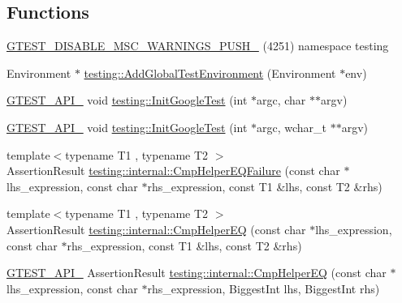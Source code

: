 \subsection*{Functions}
\begin{DoxyCompactItemize}
\item 
\mbox{\hyperlink{_obj__test_2lib_2googletest-release-1_88_81_2googletest_2include_2gtest_2gtest_8h_a88f79832f9d045112a76e9da8611cc13}{G\+T\+E\+S\+T\+\_\+\+D\+I\+S\+A\+B\+L\+E\+\_\+\+M\+S\+C\+\_\+\+W\+A\+R\+N\+I\+N\+G\+S\+\_\+\+P\+U\+S\+H\+\_\+}} (4251) namespace testing
\item 
Environment $\ast$ \mbox{\hyperlink{namespacetesting_a224caeebdb6586b728d204367fea1087}{testing\+::\+Add\+Global\+Test\+Environment}} (Environment $\ast$env)
\item 
\mbox{\hyperlink{_obj__test_2lib_2googletest-release-1_88_81_2googletest_2include_2gtest_2internal_2gtest-port_8h_aa73be6f0ba4a7456180a94904ce17790}{G\+T\+E\+S\+T\+\_\+\+A\+P\+I\+\_\+}} void \mbox{\hyperlink{namespacetesting_afd726ae08c9bd16dc52f78c822d9946b}{testing\+::\+Init\+Google\+Test}} (int $\ast$argc, char $\ast$$\ast$argv)
\item 
\mbox{\hyperlink{_obj__test_2lib_2googletest-release-1_88_81_2googletest_2include_2gtest_2internal_2gtest-port_8h_aa73be6f0ba4a7456180a94904ce17790}{G\+T\+E\+S\+T\+\_\+\+A\+P\+I\+\_\+}} void \mbox{\hyperlink{namespacetesting_ae5a88709a4a7529e30c83242156556b3}{testing\+::\+Init\+Google\+Test}} (int $\ast$argc, wchar\+\_\+t $\ast$$\ast$argv)
\item 
{\footnotesize template$<$typename T1 , typename T2 $>$ }\\Assertion\+Result \mbox{\hyperlink{namespacetesting_1_1internal_a1def8ec9393360a1b34a20528703e7f7}{testing\+::internal\+::\+Cmp\+Helper\+E\+Q\+Failure}} (const char $\ast$lhs\+\_\+expression, const char $\ast$rhs\+\_\+expression, const T1 \&lhs, const T2 \&rhs)
\item 
{\footnotesize template$<$typename T1 , typename T2 $>$ }\\Assertion\+Result \mbox{\hyperlink{namespacetesting_1_1internal_a4638c74d9b32e971f9b321af6fafc2f1}{testing\+::internal\+::\+Cmp\+Helper\+EQ}} (const char $\ast$lhs\+\_\+expression, const char $\ast$rhs\+\_\+expression, const T1 \&lhs, const T2 \&rhs)
\item 
\mbox{\hyperlink{_obj__test_2lib_2googletest-release-1_88_81_2googletest_2include_2gtest_2internal_2gtest-port_8h_aa73be6f0ba4a7456180a94904ce17790}{G\+T\+E\+S\+T\+\_\+\+A\+P\+I\+\_\+}} Assertion\+Result \mbox{\hyperlink{namespacetesting_1_1internal_a46582d95cbfe3d3d8f6945c9e9cd779c}{testing\+::internal\+::\+Cmp\+Helper\+EQ}} (const char $\ast$lhs\+\_\+expression, const char $\ast$rhs\+\_\+expression, Biggest\+Int lhs, Biggest\+Int rhs)

\end{DoxyCompactItemize}
